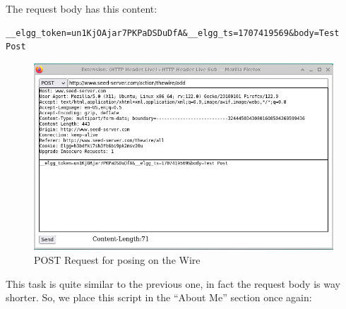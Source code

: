 \documentclass[12pt]{article}
\begin{document}
The request body has this content:

\begin{verbatim}
__elgg_token=un1KjOAjar7PKPaDSDuDfA&__elgg_ts=1707419569&body=Test Post
\end{verbatim}

    \begin{figure}[H]
         \centering
         \includegraphics[width=\textwidth]{Images/ss4.png}
         \caption{POST Request for posing on the Wire}
         \label{fig:ss4}
     \end{figure}

This task is quite similar to the previous one, in fact the request body is way shorter. So, we place this script in the ``About Me'' section once again:
\end{document}
